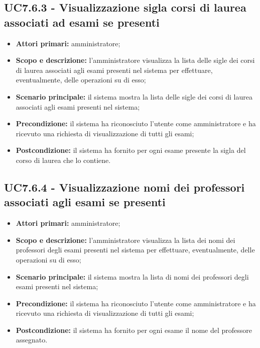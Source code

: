 \documentclass[AnalisiDeiRequisiti.tex]{subfiles}
\begin{document}
\subsection{UC7.6.3 - Visualizzazione sigla corsi di laurea associati ad esami se presenti}
\begin{itemize}
	\item \textbf{Attori primari:} amministratore;
	\item \textbf{Scopo e descrizione:} l'amministratore visualizza la lista delle sigle dei corsi di laurea associati agli esami presenti nel sistema per effettuare, eventualmente, delle operazioni su di esso;
	\item \textbf{Scenario principale:} il sistema mostra la lista delle sigle dei corsi di laurea associati agli esami presenti nel sistema;
	\item \textbf{Precondizione:} il sistema ha riconosciuto l'utente come amministratore e ha ricevuto una richiesta di visualizzazione di tutti gli esami;  
	\item \textbf{Postcondizione:} il sistema ha fornito per ogni esame presente la sigla del corso di laurea che lo contiene.
\end{itemize}
\subsection{UC7.6.4 - Visualizzazione nomi dei professori associati agli esami se presenti}
\begin{itemize}
	\item \textbf{Attori primari:} amministratore;
	\item \textbf{Scopo e descrizione:} l'amministratore visualizza la lista dei nomi dei professori degli esami presenti nel sistema per effettuare, eventualmente, delle operazioni su di esso;
	\item \textbf{Scenario principale:} il sistema mostra la lista di nomi dei professori degli esami presenti nel sistema;
	\item \textbf{Precondizione:} il sistema ha riconosciuto l'utente come amministratore e ha ricevuto una richiesta di visualizzazione di tutti gli esami; 
	\item \textbf{Postcondizione:} il sistema ha fornito per ogni esame il nome del professore assegnato.
\end{itemize}
\end{document}
